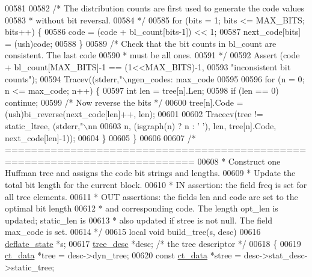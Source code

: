 \begin{DoxyCode}
{{{{{{{{{{00581 
00582     \textcolor{comment}{/* The distribution counts are first used to generate the code values}
00583 \textcolor{comment}{     * without bit reversal.}
00584 \textcolor{comment}{     */}
00585     \textcolor{keywordflow}{for} (bits = 1; bits <= MAX\_BITS; bits++) \{
00586         code = (code + bl\_count[bits-1]) << 1;
00587         next\_code[bits] = (ush)code;
00588     \}
00589     \textcolor{comment}{/* Check that the bit counts in bl\_count are consistent. The last code}
00590 \textcolor{comment}{     * must be all ones.}
00591 \textcolor{comment}{     */}
00592     Assert (code + bl\_count[MAX\_BITS]-1 == (1<<MAX\_BITS)-1,
00593             \textcolor{stringliteral}{"inconsistent bit counts"});
00594     Tracev((stderr,\textcolor{stringliteral}{"\(\backslash\)ngen\_codes: max\_code %
00595 
00596     \textcolor{keywordflow}{for} (n = 0;  n <= max\_code; n++) \{
00597         \textcolor{keywordtype}{int} len = tree[n].Len;
00598         \textcolor{keywordflow}{if} (len == 0) \textcolor{keywordflow}{continue};
00599         \textcolor{comment}{/* Now reverse the bits */}
00600         tree[n].Code = (ush)bi\_reverse(next\_code[len]++, len);
00601 
00602         Tracecv(tree != static\_ltree, (stderr,\textcolor{stringliteral}{"\(\backslash\)nn %
00603              n, (isgraph(n) ? n : \textcolor{charliteral}{' '}), len, tree[n].Code, next\_code[len]-1));
00604     \}
00605 \}
00606 
00607 \textcolor{comment}{/* ===========================================================================}
00608 \textcolor{comment}{ * Construct one Huffman tree and assigns the code bit strings and lengths.}
00609 \textcolor{comment}{ * Update the total bit length for the current block.}
00610 \textcolor{comment}{ * IN assertion: the field freq is set for all tree elements.}
00611 \textcolor{comment}{ * OUT assertions: the fields len and code are set to the optimal bit length}
00612 \textcolor{comment}{ *     and corresponding code. The length opt\_len is updated; static\_len is}
00613 \textcolor{comment}{ *     also updated if stree is not null. The field max\_code is set.}
00614 \textcolor{comment}{ */}
00615 local \textcolor{keywordtype}{void} build\_tree(s, desc)
00616     \hyperlink{structinternal__state}{deflate\_state} *s;
00617     \hyperlink{structtree__desc__s}{tree\_desc} *desc; \textcolor{comment}{/* the tree descriptor */}
00618 \{
00619     \hyperlink{structct__data__s}{ct\_data} *tree         = desc->dyn\_tree;
00620     \textcolor{keyword}{const} \hyperlink{structct__data__s}{ct\_data} *stree  = desc->stat\_desc->static\_tree;
}}}}}}}}}}}}
\end{DoxyCode}
